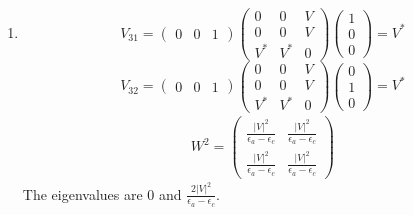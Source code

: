 \begin{enumerate}
    
    \item 
    $$
    V_{31}=
    \begin{pmatrix}
            0&0&1
        \end{pmatrix}
        \begin{pmatrix}
            0 & 0 & V \\
            0 & 0 & V \\
            V^* & V^* & 0
        \end{pmatrix}
        \begin{pmatrix}
            1\\0\\0
        \end{pmatrix}=V^*
    $$
    $$
    V_{32}=
    \begin{pmatrix}
            0&0&1
        \end{pmatrix}
        \begin{pmatrix}
            0 & 0 & V \\
            0 & 0 & V \\
            V^* & V^* & 0
        \end{pmatrix}
        \begin{pmatrix}
            0\\1\\0
        \end{pmatrix}=V^*
    $$
    \begin{align*}
        W^2 = 
        \begin{pmatrix}
            \frac{|V|^2}{\epsilon_a-\epsilon_c} & 
            \frac{|V|^2}{\epsilon_a-\epsilon_c}\\
            \frac{|V|^2}{\epsilon_a-\epsilon_c} & \frac{|V|^2}{\epsilon_a-\epsilon_c}
        \end{pmatrix}
    \end{align*}
    The eigenvalues are $0$ and $\frac{2|V|^2}{\epsilon_a-\epsilon_c}.$
\end{enumerate}

